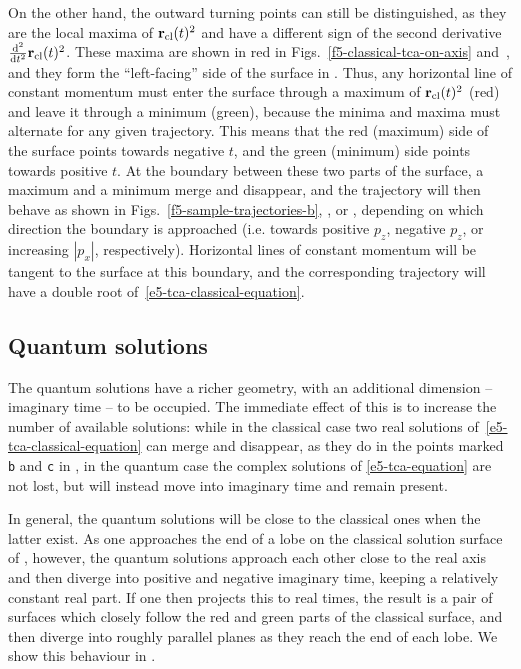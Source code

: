 On the other hand, the outward turning points can still be distinguished, as they are the local maxima of $\vb{r}_{\mathrm{cl}}(t)^2$ and have a different sign of the second derivative $\tfrac{\mathrm{d}^2}{\mathrm{d} t^2}\vb{r}_{\mathrm{cl}}(t)^2$. These maxima are shown in red in Figs.~\ref{f5-classical-tca-on-axis} and~, and they form the ``left-facing'' side of the surface in . Thus, any horizontal line of constant momentum must enter the surface through a maximum of $\vb{r}_{\mathrm{cl}}(t)^2$ (red) and leave it through a minimum (green), because the minima and maxima must alternate for any given trajectory. This means that the red (maximum) side of the surface points towards negative $t$, and the green (minimum) side points towards positive $t$. At the boundary between these two parts of the surface, a maximum and a minimum merge and disappear, and the trajectory will then behave as shown in Figs.~\ref{f5-sample-trajectories-b}, , or , depending on which direction the boundary is approached (i.e. towards positive $p_z$, negative $p_z$, or increasing $|p_x|$, respectively). Horizontal lines of constant momentum will be tangent to the surface at this boundary, and the corresponding trajectory will have a double root of~\eqref{e5-tca-classical-equation}.



\subsection{Quantum solutions}

The quantum solutions have a richer geometry, with an additional dimension -- imaginary time -- to be occupied. The immediate effect of this is to increase the number of available solutions: while in the classical case two real solutions of~\eqref{e5-tca-classical-equation} can merge and disappear, as they do in the points marked \texttt{b} and \texttt{c} in , in the quantum case the complex solutions of \eqref{e5-tca-equation} are not lost, but will instead move into imaginary time and remain present.



In general, the quantum solutions will be close to the classical ones when the latter exist. As one approaches the end of a lobe on the classical solution surface of , however, the quantum solutions approach each other close to the real axis and then diverge into positive and negative imaginary time, keeping a relatively constant real part. If one then projects this to real times, the result is a pair of surfaces which closely follow the red and green parts of the classical surface, and then diverge into roughly parallel planes as they reach the end of each lobe. We show this behaviour in .


